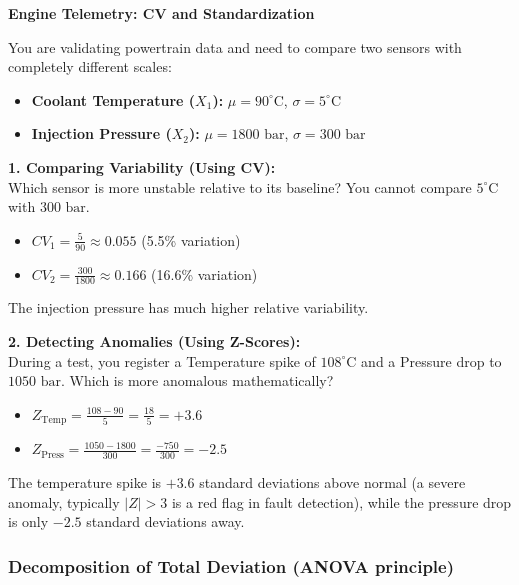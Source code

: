 \vspace{0.2cm}
\begin{example}{\textbf{Engine Telemetry: CV and Standardization}}

You are validating powertrain data and need to compare two sensors with completely different scales:
\begin{itemize}
    \item \textbf{Coolant Temperature ($X_1$):} $\mu = 90^\circ\text{C}$, $\sigma = 5^\circ\text{C}$
    \item \textbf{Injection Pressure ($X_2$):} $\mu = 1800 \text{ bar}$, $\sigma = 300 \text{ bar}$
\end{itemize}

\textbf{1. Comparing Variability (Using CV):} \\
Which sensor is more unstable relative to its baseline? You cannot compare $5^\circ\text{C}$ with $300 \text{ bar}$.
\begin{itemize}
    \item $CV_1 = \frac{5}{90} \approx 0.055$ (5.5\% variation)
    \item $CV_2 = \frac{300}{1800} \approx 0.166$ (16.6\% variation)
\end{itemize}
The injection pressure has much higher relative variability.
\vs

\textbf{2. Detecting Anomalies (Using Z-Scores):} \\
During a test, you register a Temperature spike of $108^\circ\text{C}$ and a Pressure drop to $1050 \text{ bar}$. Which is more anomalous mathematically?
\begin{itemize}
    \item $Z_{\text{Temp}} = \frac{108 - 90}{5} = \frac{18}{5} = +3.6$ 
    \item $Z_{\text{Press}} = \frac{1050 - 1800}{300} = \frac{-750}{300} = -2.5$
\end{itemize}
The temperature spike is $+3.6$ standard deviations above normal (a severe anomaly, typically $|Z| > 3$ is a red flag in fault detection), while the pressure drop is only $-2.5$ standard deviations away. 
\end{example}

\subsubsection{Decomposition of Total Deviation (ANOVA principle)}


